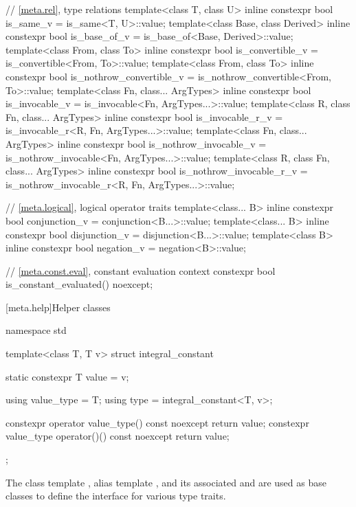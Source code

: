 \begin{codeblock}
{  // \ref{meta.rel}, type relations
  template<class T, class U>
    inline constexpr bool is_same_v = is_same<T, U>::value;
  template<class Base, class Derived>
    inline constexpr bool is_base_of_v = is_base_of<Base, Derived>::value;
  template<class From, class To>
    inline constexpr bool is_convertible_v = is_convertible<From, To>::value;
  template<class From, class To>
    inline constexpr bool is_nothrow_convertible_v = is_nothrow_convertible<From, To>::value;
  template<class Fn, class... ArgTypes>
    inline constexpr bool is_invocable_v = is_invocable<Fn, ArgTypes...>::value;
  template<class R, class Fn, class... ArgTypes>
    inline constexpr bool is_invocable_r_v = is_invocable_r<R, Fn, ArgTypes...>::value;
  template<class Fn, class... ArgTypes>
    inline constexpr bool is_nothrow_invocable_v = is_nothrow_invocable<Fn, ArgTypes...>::value;
  template<class R, class Fn, class... ArgTypes>
    inline constexpr bool is_nothrow_invocable_r_v
      = is_nothrow_invocable_r<R, Fn, ArgTypes...>::value;

  // \ref{meta.logical}, logical operator traits
  template<class... B>
    inline constexpr bool conjunction_v = conjunction<B...>::value;
  template<class... B>
    inline constexpr bool disjunction_v = disjunction<B...>::value;
  template<class B>
    inline constexpr bool negation_v = negation<B>::value;

  // \ref{meta.const.eval}, constant evaluation context
  constexpr bool is_constant_evaluated() noexcept;
}
\end{codeblock}

[meta.help]{Helper classes}

%
\begin{codeblock}
namespace std {
  template<class T, T v> struct integral_constant {
    static constexpr T value = v;

    using value_type = T;
    using type = integral_constant<T, v>;

    constexpr operator value_type() const noexcept { return value; }
    constexpr value_type operator()() const noexcept { return value; }
  };
}
\end{codeblock}

%
%
%
%
\pnum
The class template ,
alias template , and
its associated 
 and 
are used as base classes to define
the interface for various type traits.

